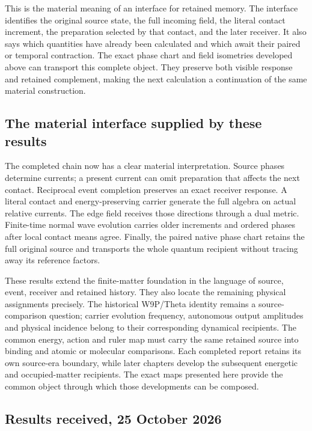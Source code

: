 This is the material meaning of an interface for retained memory. The interface identifies the original source state, the full incoming field, the literal contact increment, the preparation selected by that contact, and the later receiver. It also says which quantities have already been calculated and which await their paired or temporal contraction. The exact phase chart and field isometries developed above can transport this complete object. They preserve both visible response and retained complement, making the next calculation a continuation of the same material construction.

\subsection{The material interface supplied by these results}

The completed chain now has a clear material interpretation. Source phases determine currents; a present current can omit preparation that affects the next contact. Reciprocal event completion preserves an exact receiver response. A literal contact and energy-preserving carrier generate the full algebra on actual relative currents. The edge field receives those directions through a dual metric. Finite-time normal wave evolution carries older increments and ordered phases after local contact means agree. Finally, the paired native phase chart retains the full original source and transports the whole quantum recipient without tracing away its reference factors.

These results extend the finite-matter foundation in the language of source, event, receiver and retained history. They also locate the remaining physical assignments precisely. The historical W9P/Theta identity remains a source-comparison question; carrier evolution frequency, autonomous output amplitudes and physical incidence belong to their corresponding dynamical recipients. The common energy, action and ruler map must carry the same retained source into binding and atomic or molecular comparisons. Each completed report retains its own source-era boundary, while later chapters develop the subsequent energetic and occupied-matter recipients. The exact maps presented here provide the common object through which those developments can be composed.

\subsection{Results received, 25 October 2026}
\label{v2c18:received}

